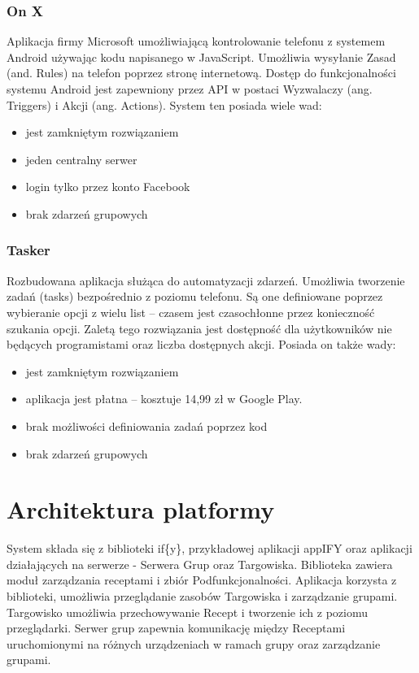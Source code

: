 \documentclass[11pt,a4paper,polish,thesis]{dcsbook}
\begin{document}
\subsection{On X\cite{onx}}
Aplikacja firmy Microsoft umożliwiającą kontrolowanie telefonu z systemem Android używając kodu napisanego w JavaScript. Umożliwia wysyłanie Zasad (and. Rules) na
telefon poprzez stronę internetową. Dostęp do funkcjonalności systemu Android jest zapewniony przez API w postaci Wyzwalaczy (ang. Triggers) i Akcji (ang. Actions).
System ten posiada wiele wad:
\begin{itemize}
\item jest zamkniętym rozwiązaniem
\item jeden centralny serwer
\item login tylko przez konto Facebook
\item brak zdarzeń grupowych
\end{itemize}

\subsection{Tasker}
Rozbudowana aplikacja służąca do automatyzacji zdarzeń. Umożliwia tworzenie zadań (tasks) bezpośrednio z poziomu telefonu. Są one definiowane poprzez wybieranie opcji z wielu list -- czasem jest czasochłonne przez konieczność szukania opcji. Zaletą tego rozwiązania jest dostępność dla użytkowników nie będących programistami oraz liczba dostępnych akcji. Posiada on także wady:
\begin{itemize}
\item jest zamkniętym rozwiązaniem
\item aplikacja jest płatna -- kosztuje 14,99 zł w Google Play. \cite{tasker}
\item brak możliwości definiowania zadań poprzez kod
\item brak zdarzeń grupowych
\end{itemize}

\chapter{Architektura platformy}
System składa się z biblioteki if\{y\}, przykładowej aplikacji appIFY oraz aplikacji działających na serwerze - Serwera Grup oraz Targowiska.
Biblioteka zawiera moduł zarządzania receptami i zbiór Podfunkcjonalności.
Aplikacja korzysta z biblioteki, umożliwia przeglądanie zasobów Targowiska i zarządzanie grupami. 
Targowisko umożliwia przechowywanie Recept i tworzenie ich z poziomu przeglądarki.
Serwer grup zapewnia komunikację między Receptami uruchomionymi na różnych urządzeniach w ramach grupy oraz zarządzanie grupami.
\end{document}
